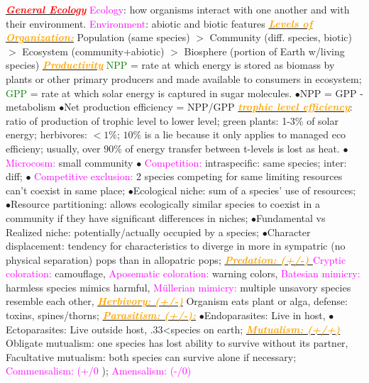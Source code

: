 \documentclass{article}
\author{SBHS Science Olympiad, Tarang}
\newcommand{\ddd}{$\bullet$}
\newcommand{\red}[1]{\textcolor{red}{#1}}
\newcommand{\green}[1]{\textcolor{green}{#1}}
\newcommand{\pink}[1]{\textcolor{magenta}{#1}}
\newcommand{\orange}[1]{\textcolor{orange}{#1}}
\newcommand{\mysection}[1]{\underline{{\textbf{\textit{\red{#1}}}}}}
\newcommand{\mysubsection}[1]{\underline{\textbf{{\textit{\orange{#1}}}}}}
\begin{document}
\tiny
\begin{multicols*}{4}
    \mysection{General Ecology} 
        \pink{Ecology}: how organisms interact with one another and with their environment. 
        \pink{Environment}: abiotic and biotic features
        \mysubsection{\textit{Levels of Organization:}} Population (same species) $>$  Community (diff. species, biotic) $>$ Ecosystem (community+abiotic) $>$ Biosphere (portion of Earth w/living species)
        \mysubsection{Productivity}
        \green{NPP} = rate at which energy is stored as biomass by plants or other primary producers and made available to consumers in ecosystem; \green{GPP} = rate at which solar energy is captured in sugar molecules.
        \ddd NPP = GPP - metabolism \ddd Net production efficiency = NPP/GPP
        \mysubsection{trophic level efficiency}: ratio of production of trophic level to lower level; green plants: 1-3\% of solar energy; herbivores: $ <1\% $; $ 10\% $ is a lie because it only applies to managed eco efficieny; usually, over $ 90\% $ of energy transfer between t-levels is lost as heat.
        \ddd \pink{ Microcosm: } small community 
        \ddd \pink{ Competition: } intraspecific: same species; inter: diff; 
        \ddd \pink{ Competitive exclusion: } 2 species competing for same limiting resources can’t coexist in same place;
        \ddd Ecological niche: sum of a species’ use of resources; 
        \ddd Resource partitioning: allows ecologically similar species to coexist in a community if they have significant differences in niches; 
        \ddd Fundamental vs Realized niche: potentially/actually occupied by a species; 
        \ddd Character displacement: tendency for characteristics to diverge in more in sympatric (no physical separation) pops than in allopatric pops; 
        \mysubsection{ Predation: (+/-) }
        \pink{Cryptic coloration: } camouflage, \pink{ Aposematic coloration: } warning colors, \pink{ Batesian mimicry: } harmless species mimics harmful, \pink{ Müllerian mimicry: } multiple unsavory species resemble each other, 
        \mysubsection{Herbivory: (+/-)} Organism eats plant or alga, defense: toxins, spines/thorns; 
        \mysubsection{Parasitism: (+/-):} 
        \ddd Endoparasites: Live in host, 
        \ddd Ectoparasites: Live outside host, .33<species on earth; 
        \mysubsection{Mutualism: (+/+)}
         Obligate mutualism: one species has lost ability to survive without its partner, Facultative mutualism: both species can survive alone if necessary; \pink{ Commensalism: (+/0 }); \pink{ Amensalism: (-/0) } 

\end{multicols*}
\end{document}

